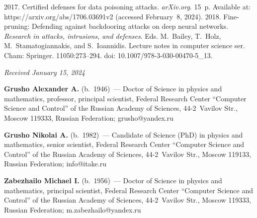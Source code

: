 \begin{multicols}{2}
{{\begin{thebibliography}{99}
 2017. Certified defenses for data 
poisoning attacks. \textit{arXiv.org}. 15~p. Available at: {\sf  
https://arxiv.org/abs/1706.03691v2} (accessed February~8, 2024).
 2018. Fine-pruning: Defending against 
backdooring attacks on deep neural networks. \textit{Research in attacks, intrusions, 
and defenses}. Eds. M.~Bailey, T.~Holz, M.~Stamatogiannakis, and S.~Ioannidis. 
Lecture notes in computer science ser. Cham: Springer. 11050:273--294. doi: 
10.1007/978-3-030-00470-5\_13.


\end{thebibliography}

 }
 }

\end{multicols}

\vspace*{-8pt}

\hfill{\small\textit{Received January 15, 2024}} 

\vspace*{-26pt}

\Contr


\noindent
\textbf{Grusho Alexander A.} (b.\ 1946)~--- Doctor of Science in physics and 
mathematics, professor, principal scientist, Federal Research Center ``Computer Science 
and Control'' of the Russian Academy of Sciences, 44-2~Vavilov Str., Moscow 119333, 
Russian Federation; \mbox{grusho@yandex.ru}


\pagebreak

\noindent
\textbf{Grusho Nikolai A.} (b.\ 1982)~--- Candidate of Science (PhD) in physics and 
mathematics, senior scientist, Federal Research Center ``Computer Science and 
Control'' of the Russian Academy of Sciences, 44-2~Vavilov Str., Moscow 119133, 
Russian Federation; \mbox{info@itake.ru}

\vspace*{4pt}

\noindent
\textbf{Zabezhailo Michael I.} (b.\ 1956)~--- Doctor of Science in physics and 
mathematics, principal scientist, Federal Research Center ``Computer Science and 
Control'' of the Russian Academy of Sciences, 44-2~Vavilov Str., Moscow 119333, 
Russian Federation; \mbox{m.zabezhailo@yandex.ru}

